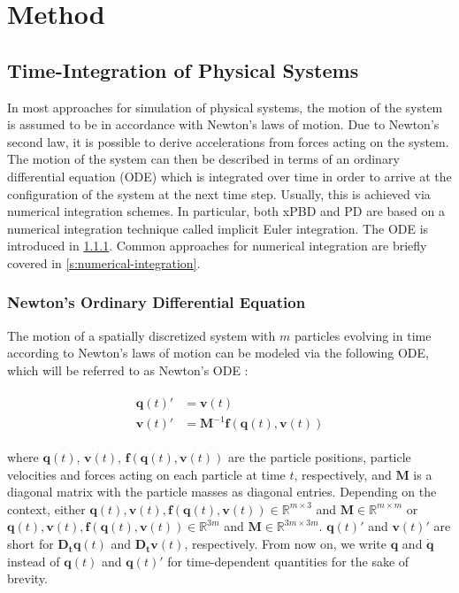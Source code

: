 \chapter{Method}\label{ch:method}

\section{Time-Integration of Physical Systems}\label{s:physical-integration}
In most approaches for simulation of physical systems, the motion of the system is assumed to be in accordance with Newton's laws of
motion. Due to Newton's second law, it is possible to derive accelerations from forces acting on the system. The motion of the system
can then be described in terms of an ordinary differential equation (ODE) which is integrated over time in order to arrive at the 
configuration of the system at the next time step. Usually, this is achieved via numerical integration schemes. In particular, both
xPBD and PD are based on a numerical integration technique called implicit Euler integration. The ODE is introduced in \cref{s:newton-ode}. 
Common approaches for numerical integration are briefly covered in \cref{s:numerical-integration}.

\subsection{Newton's Ordinary Differential Equation}\label{s:newton-ode}

The motion of a spatially discretized system with $m$ particles evolving in time according to Newton's laws of motion can be modeled via 
the following ODE, which will be referred to as Newton's ODE \cite{bouaziz2014, macklin2016, bender2017}:

\begin{align}
    \begin{split}\label{eq:newton-ode}
        \bm{q}(t)\prime &= \bm{v}(t) \\
        \bm{v}(t)\prime &= \bm{M}^{-1}\bm{f}(\bm{q}(t), \bm{v}(t))
    \end{split}
\end{align}

\noindent where $\bm{q}(t)$, $\bm{v}(t)$, $\bm{f}(\bm{q}(t), \bm{v}(t))$ are the particle positions, particle velocities and forces acting on each particle
at time $t$, respectively, and $\bm{M}$ is a diagonal matrix with the particle masses as diagonal entries. Depending on the context, either 
$\bm{q}(t), \bm{v}(t), \bm{f}(\bm{q}(t), \bm{v}(t)) \in \mathbb{R}^{m \times 3}$ and $\bm{M} \in \mathbb{R}^{m \times m}$ or $\bm{q}(t), 
\bm{v}(t), \bm{f}(\bm{q}(t), \bm{v}(t)) \in \mathbb{R}^{3m}$ and $\bm{M} \in \mathbb{R}^{3m \times 3m}$. $\bm{q}(t)\prime$ and $\bm{v}(t)\prime$ are short 
for $\bm{D_tq}(t)$ and
$\bm{D_tv}(t)$, respectively. From now on, we write $\bm{q}$ and $\dot{\bm{q}}$ instead of $\bm{q}(t)$ and $\bm{q}(t)\prime$ for 
time-dependent quantities for the sake of brevity.

